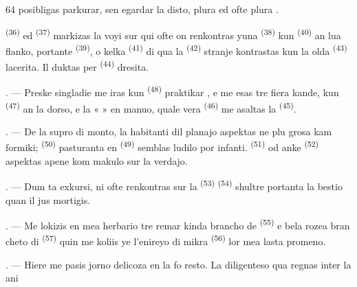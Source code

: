 \begin{VUpage}[66]{64}
\VUcontinue
posibligas parkurar, sen egardar la disto, plura\nl
{} ed ofte plura .

\VUblancAlinea
{} \textsuperscript{(36)} ed  \textsuperscript{(37)} markizas la\nl
voyi sur qui ofte on renkontras yuna \cc
{} \textsuperscript{(38)} kun  \textsuperscript{(40)} an lua flanko, portante\nl
{} \textsuperscript{(39)}, o kelka  \textsuperscript{(41)} di qua la \cc
{} \textsuperscript{(42)} stranje kontrastas kun la olda \cc
{} \textsuperscript{(43)} lacerita. Il duktas per  \textsuperscript{(44)}\nl
dresita.

\VUsaut{3.0mm}

. --- Preske singladie me iras kun \cc
{} \textsuperscript{(48)} praktikar , e me esas tre fiera\nl
kande, kun  \textsuperscript{(47)} an la dorso, e la « \cc
{} » en manuo, quale vera  \textsuperscript{(46)} me\nl
asaltas la  \textsuperscript{(45)}.

. --- De la supro di monto, la habitanti dil\nl
planajo aspektas ne plu grosa kam formiki;\nl
{} \textsuperscript{(50)} pasturanta en  \textsuperscript{(49)}\nl
semblas ludilo por infanti.  \textsuperscript{(51)} od anke\nl
{} \textsuperscript{(52)} aspektas apene kom makulo\nl
sur la verdajo.

. --- Dum ta exkursi, ni ofte renkontras\nl
sur la  \textsuperscript{(53)}  \textsuperscript{(54)} shultre\nl
portanta la bestio quan il jus mortigis.

. --- Me lokizis en mea herbario tre remar\cc
kinda brancho de  \textsuperscript{(55)} e bela rozea bran\cc
cheto di  \textsuperscript{(57)} quin me koliis ye l'enireyo\nl
di mikra  \textsuperscript{(56)} lor mea lasta promeno.

\VUsaut{3.0mm}
\VUsaut{3.0mm}

\VUsaut{3.0mm}

. --- Hiere me pasis jorno delicoza en la fo\cc
resto. La diligenteso qua regnas inter la ani\ccplein
\end{VUpage}

